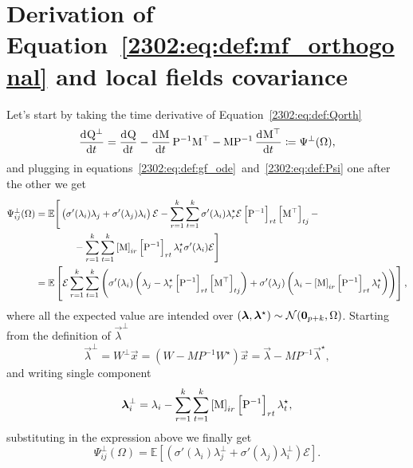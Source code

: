 \section{Derivation of Equation~\texorpdfstring{\eqref{2302:eq:def:mf_orthogonal}}{\ref{2302:eq:def:mf_orthogonal}} and local fields covariance}

\label{2302:app:mean_field_orthogonal_derivation}
Let's start by taking the time derivative of Equation~\eqref{2302:eq:def:Qorth}
\[
    \dod{\Q^\bot}{t} = \dod{\Q}{t} - \dod{\M}{t}\P^{-1}\M^\top - \M\P^{-1}\dod{\M^\top}{t} \coloneqq \Psi^\bot(\Omega),
\]
and plugging in equations~\eqref{2302:eq:def:gf_ode}~and~\eqref{2302:eq:def:Psi} one after the other we get
\[\begin{split}
\Psi^\bot_{ij}(\Omega)  &=  \mathbb E \Bigg[ \left(\sigma'(\lambda_i)\lambda_{j} + \sigma'(\lambda_j)\lambda_{i}\right) \mathcal{E}  - 
     \sum_{r=1}^k \sum_{t=1}^k \sigma'(\lambda_i)\lambda^{\star}_{r}\mathcal{E} \left[ \mathrm{P}^{-1} \right]_{rt} \left[ \mathrm{M}^\top \right]_{tj} - \\
     & \qquad\qquad -\sum_{r=1}^k \sum_{t=1}^k \left[\mathrm{M}\right]_{ir} \left[ \mathrm{P}^{-1} \right]_{rt} \lambda^{\star}_{t}\sigma'(\lambda_i)\mathcal{E}\Bigg] \\
    &= \mathbb E  \left[ 
        \mathcal{E} \sum_{r=1}^k \sum_{t=1}^k \left( 
        \sigma'(\lambda_i)\left(\lambda_{j} - \lambda^{\star}_{r} \left[\mathrm{P}^{-1}\right]_{rt} \left[\mathrm{M}^\top\right]_{tj}\right) +
        \sigma'(\lambda_j)\left(\lambda_{i} - \left[\mathrm{M}\right]_{ir} \left[\mathrm{P}^{-1}\right]_{rt} \lambda^{\star}_{t}\right)
         \right)
     \right],
\end{split}\]
where all the expected value are intended over $({\boldsymbol{\lambda}},{\boldsymbol{\lambda}}^{\star})\sim\mathcal{N}({\boldsymbol{0}}_{p+k}, \Omega)$. Starting from the definition of $\vec{\lambda}^\bot$
\[
   \vec{\lambda}^{\bot} = W^{\bot}\vec{x} = \left(W -  M P^{-1} W^\star\right)\vec{x} = \vec{\lambda} - M P^{-1} \vec{\lambda}^{\star},
\]
and writing single component
\[
   {\boldsymbol{\lambda}}^{\bot}_i = \lambda_{i}- \sum_{r=1}^k\sum_{t=1}^k\left[\mathrm{M}\right]_{ir}\left[\mathrm{P}^{-1}\right]_{rt}\lambda^{\star}_{t},
\]
substituting in the expression above we finally get
\begin{equation} 
\Psi^\bot_{ij}(\Omega) = \mathbb E \left[ \left(\sigma'(\lambda_i)\lambda^{\bot}_j + \sigma'(\lambda_j)\lambda^{\bot}_i\right)\mathcal{E}\right].
\end{equation}

